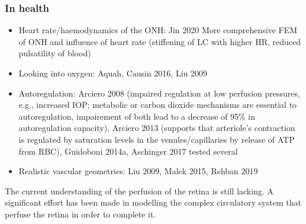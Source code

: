 \documentclass[12pt,a4paper]{journal}
\begin{document}
\subsubsection*{In health}

\begin{itemize}
\item Heart rate/haemodynamics of the ONH: Jin 2020 More comprehensive FEM of ONH and influence of heart rate (stiffening of LC with higher HR, reduced pulsatility of blood)
\item Looking into oxygen: Aquah, Causin 2016, Liu 2009
\item Autoregulation: Arciero 2008 (impaired regulation at low perfusion pressures, e.g., increased IOP; metabolic or carbon dioxide mechanisms are essential to autoregulation, impairement of both lead to a decrease of 95\% in autoregulation capacity), Arciero 2013 (supports that arteriole's contraction is regulated by saturation levels in the venules/capillaries by release of ATP from RBC), Guidoboni 2014a, Aschinger 2017 tested several 
\item Realistic vascular geometries: Liu 2009, Malek 2015, Rehban 2019
\end{itemize}

The current understanding of the perfusion of the retina is still lacking.
A significant effort has been made in modelling the complex circulatory system that perfuse the retina in order to complete it.
\end{document}
